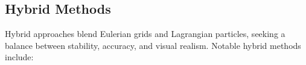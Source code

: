 \subsection{Hybrid Methods}
Hybrid approaches blend Eulerian grids and Lagrangian particles, seeking a balance between stability, accuracy, and visual realism. Notable hybrid methods include:

